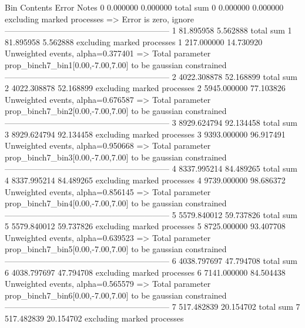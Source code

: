 Bin        Contents        Error           Notes                         
0          0.000000        0.000000        total sum                     
0          0.000000        0.000000        excluding marked processes    
  => Error is zero, ignore      
------------------------------------------------------------
1          81.895958       5.562888        total sum                     
1          81.895958       5.562888        excluding marked processes    
1          217.000000      14.730920       Unweighted events, alpha=0.377401
  => Total parameter prop_binch7_bin1[0.00,-7.00,7.00] to be gaussian constrained
------------------------------------------------------------
2          4022.308878     52.168899       total sum                     
2          4022.308878     52.168899       excluding marked processes    
2          5945.000000     77.103826       Unweighted events, alpha=0.676587
  => Total parameter prop_binch7_bin2[0.00,-7.00,7.00] to be gaussian constrained
------------------------------------------------------------
3          8929.624794     92.134458       total sum                     
3          8929.624794     92.134458       excluding marked processes    
3          9393.000000     96.917491       Unweighted events, alpha=0.950668
  => Total parameter prop_binch7_bin3[0.00,-7.00,7.00] to be gaussian constrained
------------------------------------------------------------
4          8337.995214     84.489265       total sum                     
4          8337.995214     84.489265       excluding marked processes    
4          9739.000000     98.686372       Unweighted events, alpha=0.856145
  => Total parameter prop_binch7_bin4[0.00,-7.00,7.00] to be gaussian constrained
------------------------------------------------------------
5          5579.840012     59.737826       total sum                     
5          5579.840012     59.737826       excluding marked processes    
5          8725.000000     93.407708       Unweighted events, alpha=0.639523
  => Total parameter prop_binch7_bin5[0.00,-7.00,7.00] to be gaussian constrained
------------------------------------------------------------
6          4038.797697     47.794708       total sum                     
6          4038.797697     47.794708       excluding marked processes    
6          7141.000000     84.504438       Unweighted events, alpha=0.565579
  => Total parameter prop_binch7_bin6[0.00,-7.00,7.00] to be gaussian constrained
------------------------------------------------------------
7          517.482839      20.154702       total sum                     
7          517.482839      20.154702       excluding marked processes    
